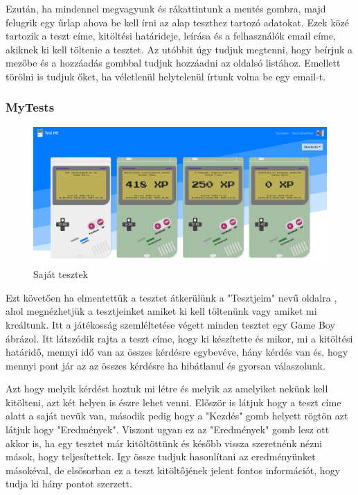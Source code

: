 Ezután, ha mindennel megvagyunk és rákattintunk a mentés gombra, majd felugrik egy űrlap  ahova be kell írni az alap teszthez tartozó adatokat. Ezek közé tartozik a teszt címe, kitöltési határideje, leírása és a felhasználók email címe, akiknek ki kell töltenie a tesztet. Az utóbbit úgy tudjuk megtenni, hogy beírjuk a mezőbe és a hozzáadás gombbal tudjuk hozzáadni az oldalsó listához. Emellett törölni is tudjuk őket, ha véletlenül helytelenül írtunk volna be egy email-t.

\subsubsection{MyTests}


\begin{figure}[H]
    \centering
    \includegraphics[width=\linewidth]{images/my_tests.png}
    \caption{Saját tesztek}
    \label{fig:my_tests}
\end{figure}

Ezt követően ha elmentettük a tesztet átkerülünk a "Tesztjeim" nevű oldalra , ahol megnézhetjük a tesztjeinket amiket ki kell töltenünk vagy amiket mi kreáltunk. Itt a játékosság szemléltetése végett minden tesztet egy Game Boy ábrázol. Itt látszódik rajta a teszt címe, hogy ki készítette és mikor, mi a kitöltési határidő, mennyi idő van az összes kérdésre egybevéve, hány kérdés van és, hogy mennyi pont jár az az összes kérdésre ha hibátlanul és gyorsan válaszolunk. \newline

Azt hogy melyik kérdést hoztuk mi létre és melyik az amelyiket nekünk kell kitölteni, azt két helyen is észre lehet venni. Először is látjuk hogy a teszt címe alatt a saját nevük van, második pedig hogy a "Kezdés" gomb helyett rögtön azt látjuk hogy "Eredmények". Viszont ugyan ez az "Eredmények" gomb lesz ott akkor is, ha egy tesztet már kitöltöttünk és később vissza szeretnénk nézni mások, hogy teljesítettek. Igy össze tudjuk hasonlítani az eredményünket másokéval, de elsősorban ez a teszt kitöltőjének jelent fontos információt, hogy tudja ki hány pontot szerzett. \newline

